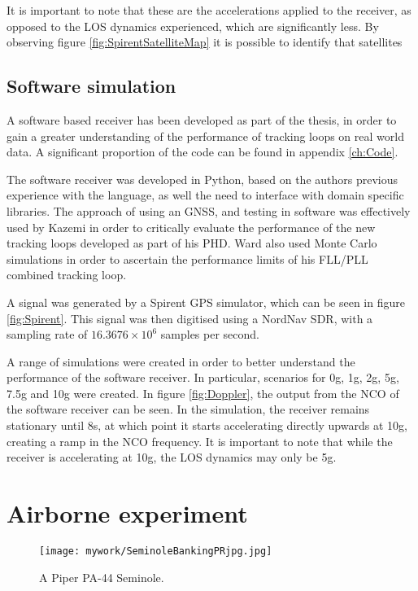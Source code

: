 It is important to note that these are the accelerations applied to the receiver, as opposed to the \ac{LOS} dynamics experienced, which are significantly less. By observing figure \ref{fig:SpirentSatelliteMap} it is possible to identify that satellites 


\subsection{Software simulation}

A software based receiver has been developed as part of the thesis, in order to gain a greater understanding of the performance of tracking loops on real world data. A significant proportion of the code can be found in appendix \ref{ch:Code}.

The software receiver was developed in Python, based on the authors previous experience with the language, as well the need to interface with domain specific libraries.  The approach of using an \ac{GNSS}, and testing in software was effectively used by Kazemi \cite{KazemiPHD} in order to critically evaluate the performance of the new tracking loops developed as part of his PHD. Ward also used Monte Carlo simulations in order to ascertain the performance limits of his FLL/PLL combined tracking loop.

A signal was generated by a Spirent \ac{GPS} simulator, which can be seen in figure \ref{fig:Spirent}. This signal was then digitised using a NordNav \ac{SDR}, with a sampling rate of $16.3676 \times 10^6$ samples per second. 

A range of simulations were created in order to better understand the performance of the software receiver. In particular, scenarios for 0g, 1g, 2g, 5g, 7.5g and 10g were created. In figure \ref{fig:Doppler}, the output from the \ac{NCO} of the software receiver can be seen. In the simulation, the receiver remains stationary until 8s, at which point it starts accelerating directly upwards at 10g, creating a ramp in the \ac{NCO} frequency. It is important to note that while the receiver is accelerating at 10g, the \ac{LOS} dynamics may only be 5g. 


\section{Airborne experiment}

\begin{figure}[!htb] 
    \centering
    \texttt{[image: mywork/SeminoleBankingPRjpg.jpg]} 
    \caption{A Piper PA-44 Seminole.}
    \label{fig:PiperSeminole}
\end{figure}

